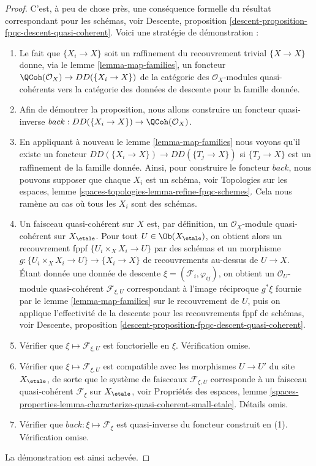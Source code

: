 \begin{proof}
C'est, à peu de chose près, une conséquence formelle du
résultat correspondant pour les schémas, voir
Descente, proposition \ref{descent-proposition-fpqc-descent-quasi-coherent}.
Voici une stratégie de démonstration :
\begin{enumerate}
\item Le fait que $\{X_i \to X\}$ soit un raffinement du recouvrement trivial
$\{X \to X\}$ donne, via
le lemme \ref{lemma-map-families},
un foncteur $\QCoh(\mathcal{O}_X) \to DD(\{X_i \to X\})$ de la
catégorie des $\mathcal{O}_X$-modules quasi-cohérents vers la catégorie des
données de descente pour la famille donnée.
\item Afin de démontrer la proposition, nous allons construire un
foncteur quasi-inverse
$back : DD(\{X_i \to X\}) \to \QCoh(\mathcal{O}_X)$.
\item En appliquant à nouveau
le lemme \ref{lemma-map-families}
nous voyons qu'il existe un foncteur
$DD(\{X_i \to X\}) \to DD(\{T_j \to X\})$
si $\{T_j \to X\}$ est un raffinement de la famille donnée.
Ainsi, pour construire le foncteur $back$, nous pouvons supposer que
chaque $X_i$ est un schéma, voir
Topologies sur les espaces,
lemme \ref{spaces-topologies-lemma-refine-fpqc-schemes}.
Cela nous ramène au cas où tous les $X_i$ sont des schémas.
\item Un faisceau quasi-cohérent sur $X$ est, par définition, un
$\mathcal{O}_X$-module quasi-cohérent sur $X_\etale$. Pour tout
$U \in \Ob(X_\etale)$, on obtient alors un recouvrement fppf
$\{U_i \times_X X_i \to U\}$ par des schémas et un morphisme
$g : \{U_i \times_X X_i \to U\} \to \{X_i \to X\}$ de recouvrements
au-dessus de $U \to X$. Étant donnée une donnée de descente
$\xi = (\mathcal{F}_i, \varphi_{ij})$, on obtient un
$\mathcal{O}_U$-module quasi-cohérent $\mathcal{F}_{\xi, U}$ correspondant
à l'image réciproque $g^*\xi$ fournie par le
lemme \ref{lemma-map-families}
sur le recouvrement de $U$, puis on applique l'effectivité de la descente
pour les recouvrements fppf de schémas, voir Descente, proposition \ref{descent-proposition-fpqc-descent-quasi-coherent}.
\item Vérifier que $\xi \mapsto \mathcal{F}_{\xi, U}$ est fonctorielle en $\xi$.
Vérification omise.
\item Vérifier que $\xi \mapsto \mathcal{F}_{\xi, U}$ est compatible
avec les morphismes $U \to U'$ du site $X_\etale$, de sorte que
le système de faisceaux $\mathcal{F}_{\xi, U}$ corresponde à un faisceau quasi-cohérent
$\mathcal{F}_\xi$ sur $X_\etale$, voir
Propriétés des espaces,
lemme \ref{spaces-properties-lemma-characterize-quasi-coherent-small-etale}.
Détails omis.
\item Vérifier que $back : \xi \mapsto \mathcal{F}_\xi$ est quasi-inverse
du foncteur construit en (1). Vérification omise.
\end{enumerate}
La démonstration est ainsi achevée.
\end{proof}









